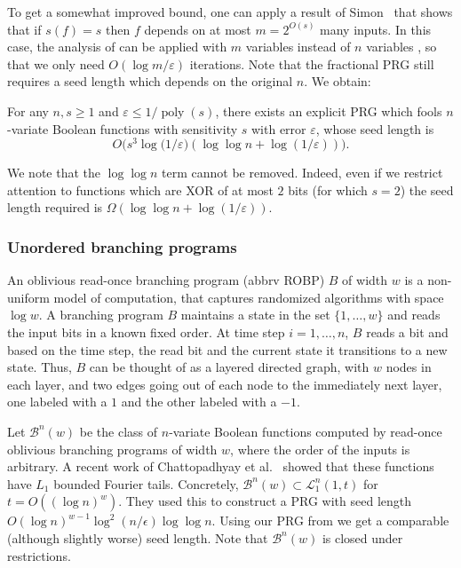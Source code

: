 \documentclass{toc}
\newcommand{\LL}{\mathcal{L}}
\newcommand{\BB}{\mathcal{B}}
\newcommand{\eps}{\varepsilon}
\DeclareMathOperator{\poly}{poly}      %
\begin{document}
To get a somewhat improved bound, one can apply a result of Simon~\cite{simon1983tight} that shows that if $s(f)=s$
then $f$ depends on at most $m=2^{O(s)}$ many inputs. In this case, the analysis of  can be applied
with $m$ variables instead of $n$ variables , so that we only need $O(\log m/\eps)$ iterations. Note that the fractional PRG still requires
a seed length which depends on the original $n$. We obtain:

\begin{corollary}
\label{cor:sensitivity}
For any $n,s \ge 1$ and $\eps\leq 1/\poly(s)$, there exists an
explicit PRG which fools $n$-variate Boolean functions with
sensitivity $s$ with error $\eps$, whose seed length is
\[
  O\bigl(s^3 \log\bigl(1/\eps) (\log\log n + \log(1/\eps))\bigr).
\]
\end{corollary}

We note that the $\log\log n$ term cannot be removed. Indeed, even if we restrict attention to functions which are XOR of at most $2$ bits (for which $s=2$) the seed length required is $\Omega(\log\log n + \log(1/\eps))$.

\subsubsection{Unordered branching programs}
An oblivious read-once branching program (abbrv ROBP) $B$ of width $w$ is a non-uniform model of computation, that captures randomized algorithms with space $\log w$.  A branching program $B$ maintains a state in the set $\{1,\ldots,w\}$ and reads the input bits in a known fixed order. At time step $i =1,\ldots,n$, $B$ reads a bit and based on the time step, the read bit and the current state it transitions to a new state.
Thus, $B$ can be thought of as a layered directed graph, with $w$ nodes in each layer, and two edges going out of each node to the immediately next layer, one labeled with a $1$ and the other labeled with a $-1$.

Let $\BB^n(w)$ be the class of $n$-variate Boolean functions computed by read-once oblivious branching programs of width $w$,
where the order of the inputs is arbitrary.
A recent work of Chattopadhyay {et al.}~\cite{chattopadhyay2018improved} showed that these functions
have $L_1$ bounded Fourier tails. Concretely, $\BB^n(w) \subset \LL_1^n(1,t)$ for $t=O((\log n)^w)$.
They used this to construct a PRG with seed length $O(\log n)^{w-1} \log^2(n/\epsilon)\log \log n$.
Using our PRG from  we get a comparable (although slightly worse) seed length.
Note that $\BB^n(w)$ is closed under restrictions.
\end{document}
